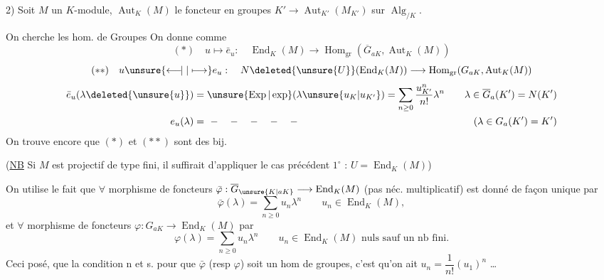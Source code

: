 2) Soit $M$ un $K$-module, $\operatorname{Aut}_K(M)$  le foncteur en groupes $K'\longrightarrow\operatorname{Aut}_{K'}(M_{K'})$ sur $\operatorname{Alg}_{/K}$.

On cherche les hom. de Groupes
On donne comme 
\[
(*)\quad u\longmapsto\bar e_u:\quad\operatorname{End}_K(M)\longrightarrow\operatorname{Hom}_{\mathrm{gr}}(\overline G_{aK},\operatorname{Aut}_K(M))
\]
\[
(**)\quad u\unsure{\longleftarrow\!\mid|\longmapsto}e_u:\quad N\deleted{\unsure{U}}(\operatorname{End}_K(M))\longrightarrow\operatorname{Hom}_{\mathrm{gr}}(G_{aK},\operatorname{Aut}_K(M))
\]
\[
\begin{aligned}
\bar e_u(\lambda\deleted{\unsure{u}})&=\unsure{\operatorname{Exp}|\exp}(\lambda\unsure{u_K|u_{K'}})=\sum_{n\geq0}\frac{u_{K'}^n}{n!}\lambda^n
&\quad\lambda\in\overline G_a(K')=N(K')\\
e_u(\lambda)&=\ -\quad-\quad-\quad-\quad-
&\quad(\lambda\in G_a(K')=K')
\end{aligned}
\]
On trouve encore que $(*)$ et $(**)$ sont des bij.

(\uline{NB} Si $M$ est projectif de type fini, il suffirait d'appliquer le cas précédent $1^\circ$ : $U=\operatorname{End}_K(M)$)

On utilise le fait que $\forall$ morphisme de foncteurs $\bar\varphi:\overline G_{\unsure{K|aK}}\longrightarrow\operatorname{End}_K(M)$ (pas néc. multiplicatif) est donné de façon unique par
\[
\bar\varphi(\lambda)=\sum_{n\geq0}u_n\lambda^n\qquad u_n\in\operatorname{End}_K(M),
\]
et $\forall$ morphisme de foncteurs $\varphi:G_{aK}\longrightarrow\operatorname{End}_K(M)$ par
\[
\varphi(\lambda)=\sum_{n\geq0}u_n\lambda^n\qquad u_n\in\operatorname{End}_K(M)\text{ nuls sauf un nb fini.}
\]
Ceci posé,   que la condition n et s. pour que $\bar\varphi$ (resp $\varphi$) soit un hom de groupes, c'est qu'on ait $u_n=\dfrac1{n!}(u_1)^n$ \ldots
